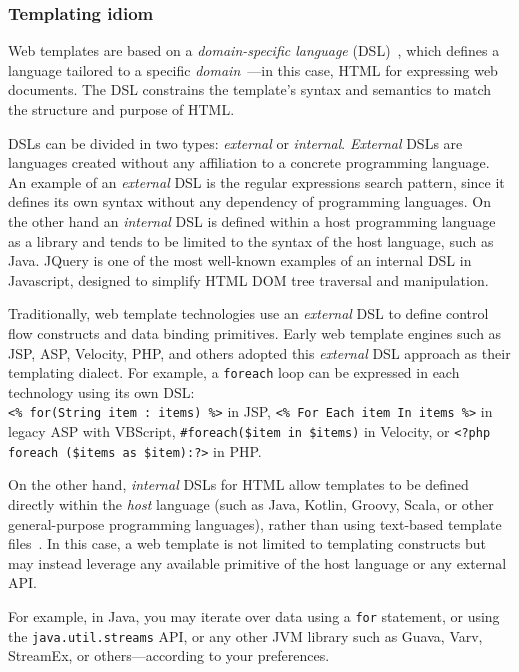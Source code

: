 \subsubsection{Templating idiom}

Web templates are based on a \textit{domain-specific language}
(DSL)~\cite{landin1966next}, which defines a language tailored to a specific
\textit{domain}~\cite{evans2004domain}—in this case, HTML for expressing web
documents.
The DSL constrains the template's syntax and semantics to match the structure
and purpose of HTML.

DSLs can be divided in two types: \textit{external} or
\textit{internal}\cite{dslbook}.
\textit{External} DSLs are languages created without any affiliation to a
concrete programming language.
An example of an \textit{external} DSL is the regular expressions search
pattern\cite{thompson1968}, since it defines its own syntax without any
dependency of programming languages. 
On the other hand an \textit{internal} DSL is defined within a host programming
language as a library and tends to be limited to the syntax of the host language,
such as Java.
JQuery\cite{resig2007pro} is one of the most well-known examples of an internal
DSL in Javascript, designed to simplify HTML DOM\cite{dom} tree traversal and
manipulation.

Traditionally, web template technologies use an \textit{external} DSL to define
control flow constructs and data binding primitives. Early web template engines
such as JSP, ASP, Velocity, PHP, and others adopted this \textit{external} DSL
approach as their templating dialect.
For example, a \texttt{foreach} loop can be expressed in each technology using its 
own DSL:
\\\texttt{<\% for(String item : items) \%>} in JSP, \texttt{<\% For Each item 
In items \%>} in legacy ASP with VBScript, \texttt{\#foreach(\$item in \$items)} in 
Velocity, or \texttt{<?php foreach (\$items as \$item):?>} in PHP.

On the other hand, \textit{internal} DSLs for HTML allow templates to be defined 
directly within the \emph{host} language (such as Java, Kotlin, Groovy, Scala, or 
other general-purpose programming languages), rather than using text-based 
template files~\cite{carvalho2019hot}. In this case, a web template is not limited 
to templating constructs but may instead leverage any available primitive of the 
host language or any external API.

For example, in Java, you may iterate over data using a \texttt{for} statement,
or using the \texttt{java.util.streams} API, or any other JVM library such as
Guava, Varv, StreamEx, or others—according to your preferences.

